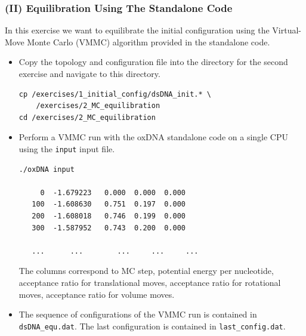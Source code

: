 \documentclass[slidestop,compress,9pt]{beamer}
\begin{document}
\begin{frame}[fragile]
\frametitle{(II) Equilibration Using The Standalone Code}
\small
In this exercise we want to equilibrate the initial configuration using the Virtual-Move Monte Carlo (VMMC) algorithm provided in the standalone code.\\[7pt]

\begin{itemize}
\item Copy the topology and configuration file into the directory for the second exercise and navigate to this directory.
\begin{lstlisting}
cp /exercises/1_initial_config/dsDNA_init.* \ 
    /exercises/2_MC_equilibration
cd /exercises/2_MC_equilibration
\end{lstlisting}
\item Perform a VMMC run with the oxDNA standalone code on a single CPU using the \texttt{input} input file.
\linespread{0.4}
\begin{lstlisting}
./oxDNA input 

     0  -1.679223   0.000  0.000  0.000   
   100  -1.608630   0.751  0.197  0.000   
   200  -1.608018   0.746  0.199  0.000   
   300  -1.587952   0.743  0.200  0.000   

   ...      ...        ...     ...     ...  
\end{lstlisting}
The columns correspond to MC step, potential energy per nucleotide, acceptance ratio for translational moves, acceptance ratio for rotational moves, acceptance ratio for volume moves.

\item The sequence of configurations of the VMMC run is contained in \texttt{dsDNA\_equ.dat}. The last configuration is contained in \texttt{last\_config.dat}.

\end{itemize}

\end{frame}
\end{document}
